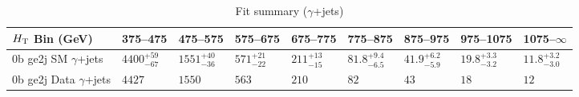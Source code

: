 \documentclass[8pt]{article}
\def\scalht{\mbox{$H_{\rm{T}}$}\xspace}
\newcommand\T{\rule{0pt}{2.6ex}}
\begin{document}
\begin{table}[ht!]
\caption{Fit summary ($\gamma$+jets)}
\label{tab:ensemble-summary}
\centering
\begin{tabular}{ lllllllll }

\hline
\scalht Bin (GeV)       & 375--475                       & 475--575                       & 575--675                       & 675--775                       & 775--875                       & 875--975                       & 975--1075                      & 1075--$\infty$                 \\ [1.000000ex]
\hline
0b ge2j SM $\gamma$+jets\T & $4400^{+59}_{-67}$             & $1551^{+40}_{-36}$             & $571^{+21}_{-22}$              & $211^{+13}_{-15}$              & $81.8^{+9.4}_{-6.5}$           & $41.9^{+6.2}_{-5.9}$           & $19.8^{+3.3}_{-3.2}$           & $11.8^{+3.2}_{-3.0}$           \\ 
0b ge2j Data $\gamma$+jets\T & $4427$                         & $1550$                         & $563$                          & $210$                          & $82$                           & $43$                           & $18$                           & $12$                           \\ 
\hline

\end{tabular}
\end{table}
\end{document}
